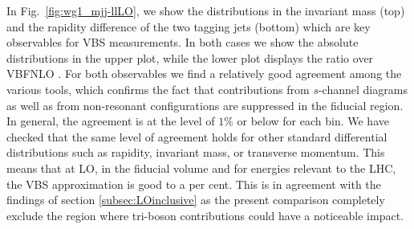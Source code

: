 In Fig.~\ref{fig:wg1_mjj-llLO}, we show the distributions in the invariant mass (top) and the rapidity difference of the two tagging jets (bottom) which are key observables for VBS measurements.
In both cases we show the absolute distributions in the upper plot, while the lower plot displays the ratio over {\sc VBFNLO} .
For both observables we find a relatively good agreement among the various tools, which confirms the fact that contributions from $s$-channel diagrams as well as from non-resonant configurations are suppressed in the fiducial region.
In general, the agreement is at the level of $1\%$ or below for each bin.
We have checked that the same level of agreement holds for other standard differential distributions such as rapidity, invariant mass, or transverse momentum.
This means that at LO, in the fiducial volume and for energies relevant to the LHC, the VBS approximation is good to a per cent.
This is in agreement with the findings of section \ref{subsec:LOinclusive} as the present comparison completely exclude the region where tri-boson contributions could have a noticeable impact.

